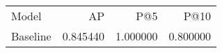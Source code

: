 \begin{tabular}{lrrr}
Model & AP & P@5 & P@10 \\
Baseline & 0.845440 & 1.000000 & 0.800000 \\
\end{tabular}
